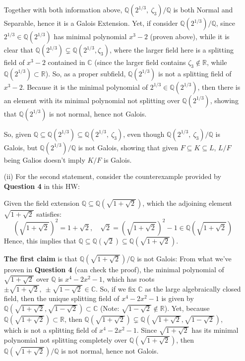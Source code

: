 \documentclass{article}
\begin{document}
\begin{itemize}
    Together with both information above, $\mathbb{Q}(2^{1/3},\ \zeta_3)/\mathbb{Q}$ is both Normal and Separable, hence it is a Galois Extension. 
    Yet, if consider $\mathbb{Q}(2^{1/3})/\mathbb{Q}$, since $2^{1/3}\in \mathbb{Q}(2^{1/3})$ has minimal polynomial $x^3-2$ (proven above), while it is clear that $\mathbb{Q}(2^{1/3})\subsetneq \mathbb{Q}(2^{1/3},\zeta_3)$, where the larger field here is a splitting field of $x^3-2$ contained in $\mathbb{C}$ (since the larger field contains $\zeta_3\notin \mathbb{R}$, while $\mathbb{Q}(2^{1/3})\subset \mathbb{R}$). So, as a proper subfield, $\mathbb{Q}(2^{1/3})$ is not a splitting field of $x^3-2$. Because it is the minimal polynomial of $2^{1/3}\in \mathbb{Q}(2^{1/3})$, then there is an element with its minimal polynomial not splitting over $\mathbb{Q}(2^{1/3})$, showing that $\mathbb{Q}(2^{1/3})$ is not normal, hence not Galois.

    So, given $\mathbb{Q}\subseteq \mathbb{Q}(2^{1/3})\subseteq \mathbb{Q}(2^{1/3},\ \zeta_3)$, even though $\mathbb{Q}(2^{1/3},\ \zeta_3)/\mathbb{Q}$ is Galois, but $\mathbb{Q}(2^{1/3})/\mathbb{Q}$ is not Galois, showing that given $F\subseteq K\subseteq L$, $L/F$ being Galios doesn't imply $K/F$ is Galois.

    \hfil

    \item[(ii)] For the second statement, consider the counterexample provided by \textbf{Question 4} in this HW:
    
    Given the field extension $\mathbb{Q}\subseteq \mathbb{Q}(\sqrt{1+\sqrt{2}})$, which the adjoining element $\sqrt{1+\sqrt{2}}$ satisfies:
    $$\left(\sqrt{1+\sqrt{2}}\right)^2 = 1+\sqrt{2},\quad \sqrt{2} = \left(\sqrt{1+\sqrt{2}}\right)^2-1 \in\mathbb{Q}\left(\sqrt{1+\sqrt{2}}\right)$$
    Hence, this implies that $\mathbb{Q}\subseteq \mathbb{Q}(\sqrt{2})\subseteq \mathbb{Q}(\sqrt{1+\sqrt{2}})$.

    \textbf{The first claim} is that $\mathbb{Q}(\sqrt{1+\sqrt{2}})/\mathbb{Q}$ is not Galois: From what we've proven in \textbf{Question 4} (can check the proof), the minimal polynomial of $\sqrt{1+\sqrt{2}}$ over $\mathbb{Q}$ is $x^4-2x^2-1$, which has roots $\pm\sqrt{1+\sqrt{2}},\ \pm\sqrt{1-\sqrt{2}}\in\mathbb{C}$. So, if we fix $\mathbb{C}$ as the large algebraically closed field, then the unique splitting field of $x^4-2x^2-1$ is given by $\mathbb{Q}(\sqrt{1+\sqrt{2}},\sqrt{1-\sqrt{2}})\subset \mathbb{C}$ (Note: $\sqrt{1-\sqrt{2}}\notin \mathbb{R}$). Yet, because $\mathbb{Q}(\sqrt{1+\sqrt{2}})\subset\mathbb{R}$, then $\mathbb{Q}(\sqrt{1+\sqrt{2}})\subsetneq \mathbb{Q}(\sqrt{1+\sqrt{2}},\sqrt{1-\sqrt{2}})$, which is not a splitting field of $x^4-2x^2-1$. Since $\sqrt{1+\sqrt{2}}$ has its minimal polynomial not splitting completely over $\mathbb{Q}(\sqrt{1+\sqrt{2}})$, then $\mathbb{Q}(\sqrt{1+\sqrt{2}})/\mathbb{Q}$ is not normal, hence not Galois.


\end{itemize}
\end{document}
